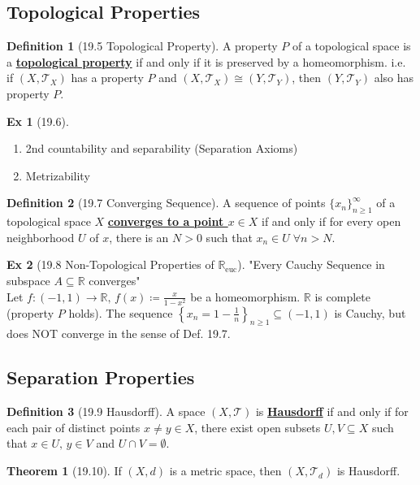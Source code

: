 \documentclass{article}
\newcommand{\R}{\ensuremath{\mathbb{R}}}
\newcommand{\nbd}{neighborhood}
\newcommand{\Iff}{if and only if}
\newcommand{\ts}{topological space}
\newcommand{\es}{\ensuremath{\emptyset}}
\newcommand{\coleq}{\ensuremath{\coloneqq}}
\newcommand{\define}[1]{\textbf{\underline{#1}}}
\newcommand{\func}[3]{\ensuremath{#1: #2 \to #3}}
\newcommand{\tp}{\ensuremath{\mathcal{T}}}
\newcommand{\Ts}[2]{\ensuremath{(#1,#2)}}
\newcommand{\inter}{\cap}
\renewcommand{\Subset}{\subseteq}
\theoremstyle{definition}
\newtheorem*{defn}{Definition}
\newtheorem*{thm}{Theorem}
\newtheorem*{ex}{Ex}
\theoremstyle{remark}
\begin{document}
{        \subsection*{Topological Properties}{
            \begin{defn}[19.5 Topological Property]
                A property \define{$P$} of a \ts{} is a \define{topological property} \Iff{} it is preserved by a homeomorphism. i.e. if $\Ts{X}{\tp_X}$ has a property $P$ and $\Ts{X}{\tp_X} \cong \Ts{Y}{\tp_Y}$, then $\Ts{Y}{\tp_Y}$ also has property $P$.
            \end{defn}
            
            \begin{ex}[19.6]\hfill
                \begin{enumerate}
                    \item 2nd countability and separability (Separation Axioms)
                    \item Metrizability
                \end{enumerate}
            \end{ex}
            
            \begin{defn}[19.7 Converging Sequence]
                A sequence of points $\{x_n\}_{n\geq1}^\infty$ of a \ts{} $X$ \define{converges to a point $x \in X$} \Iff{} for every open \nbd{} $U$ of $x$, there is an $N>0$ such that $x_n \in U \; \forall n>N$.  
            \end{defn}
            
            \begin{ex}[19.8 Non-Topological Properties of $\R_{\text{euc}}$]
                "Every Cauchy Sequence in subspace $A\Subset \R$ converges"\\
                Let $\func{f}{(-1,1)}{\R}, \, f(x)\coleq \frac{x}{1-x^2}$ be a homeomorphism. $\R$ is complete (property $P$ holds). The sequence $\left\{x_n=1-\frac{1}{n}\right\}_{n\geq 1} \Subset (-1,1)$ is Cauchy, but does NOT converge in the sense of Def. 19.7.
            \end{ex}
        }
        \subsection*{Separation Properties}{
            \begin{defn}[19.9 Hausdorff]
                A space $\Ts{X}{\tp}$ is \define{Hausdorff} \Iff{} for each pair of distinct points $x\neq y \in X$, there exist open subsets $U,V \Subset X$ such that $x \in U, \, y\in V$ and $U \inter V =  \es$.
            \end{defn}
            
            \begin{thm}[19.10]
                If $\Ts{X}{d}$ is a metric space, then $\Ts{X}{\tp_d}$ is Hausdorff.
            \end{thm}
        
        }
    }


        
\end{document}
